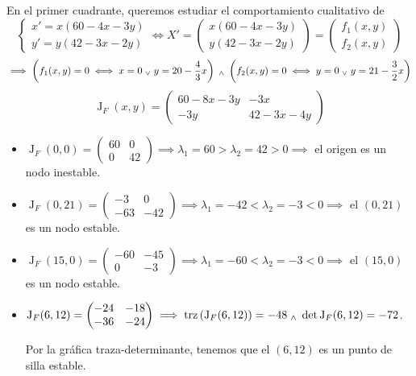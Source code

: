 \begin{ejem}
	En el primer cuadrante, queremos estudiar el comportamiento cualitativo de
	\[\begin{cases}
			x' = x(60-4x-3y) \\y ' = y (42 - 3x-2y)
		\end{cases}\iff X' = \begin{pmatrix}
			x(60-4x-3y) \\y (42-3x-2y)
		\end{pmatrix} = \begin{pmatrix}
			f_1(x, y) \\f_2(x, y)
		\end{pmatrix}\]
	\[\implies \left(f_1 (x,y) = 0 \iff x = 0 \; _{\vee} \; y = 20 - \frac{4}{3}x \right) \; _{\wedge} \; \left(f_2 (x,y) = 0 \iff y = 0 \; _{\vee} \; y = 21 - \frac{3}{2}x \right)\]
	\[\operatorname{J}_F(x,y) = \begin{pmatrix}
			60 - 8x - 3y & -3x          \\
			-3y          & 42 - 3x - 4y
		\end{pmatrix}\]
	\begin{itemize}
		\item $\operatorname{J}_F(0,0) = \begin{pmatrix}
				      60 & 0  \\
				      0  & 42
			      \end{pmatrix} \implies \lambda_1 = 60 > \lambda_2 = 42 > 0 \implies$ el origen es un nodo inestable.
		\item $\operatorname{J}_F(0, 21) = \begin{pmatrix}
				      -3  & 0   \\
				      -63 & -42
			      \end{pmatrix} \implies \lambda_1 = -42 < \lambda_2 = -3 < 0 \implies$ el $(0, 21)$ es un nodo estable.
		\item $\operatorname{J}_F(15, 0) = \begin{pmatrix}
				      -60 & -45 \\
				      0   & -3
			      \end{pmatrix} \implies \lambda_1 = -60 < \lambda_2 = -3 < 0 \implies$ el $(15, 0)$ es un nodo estable.
		\item $\operatorname{J}_F(6, 12) = \begin{pmatrix}
				      -24 & -18 \\
				      -36 & -24
			      \end{pmatrix} \implies \operatorname{trz}\left(\operatorname{J}_F(6, 12)\right) = -48 \; _{\wedge} \; \det{\operatorname{J}_F(6, 12)} = -72$.

		      Por la gráfica traza-determinante, tenemos que el $(6, 12)$ es un punto de silla estable.
	\end{itemize}
\end{ejem}

